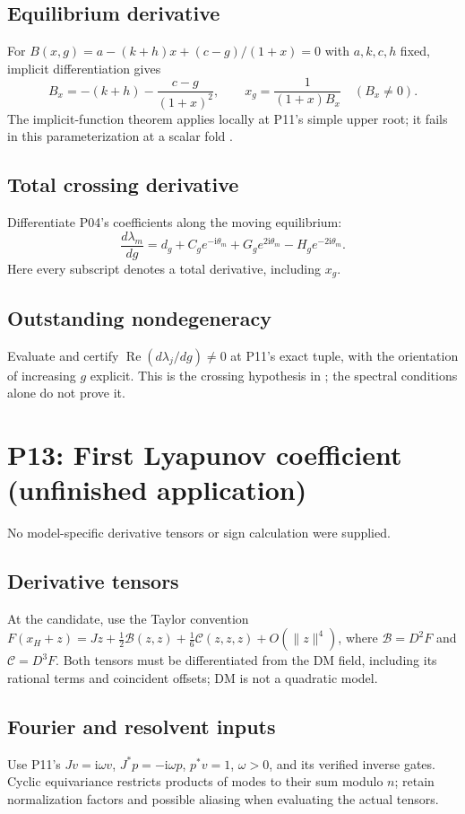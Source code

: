 \documentclass[11pt]{article}
\let\OriginalCite\cite
\renewcommand{\cite}[2][]{%
  \textcolor{CitationRed}{%
    \if\relax\detokenize{#1}\relax
      \OriginalCite{#2}%
    \else
      \OriginalCite[#1]{#2}%
    \fi}}
\newcommand{\ii}{\mathrm{i}}
\DeclareMathOperator{\Ree}{Re}
\theoremstyle{definition}
\theoremstyle{remark}
\begin{document}
\subsection{Equilibrium derivative}\label{slot:P12-1}
For $B(x,g)=a-(k+h)x+(c-g)/(1+x)=0$ with $a,k,c,h$ fixed,
implicit differentiation gives
\[
 B_x=-(k+h)-\frac{c-g}{(1+x)^2},\qquad
 x_g=\frac{1}{(1+x)B_x}\quad(B_x\ne0).
\]
The implicit-function theorem applies locally at P11's simple upper root;
it fails in this parameterization at a scalar fold
\cite[Ch.~1]{GuckenheimerHolmes1983}.
\subsection{Total crossing derivative}\label{slot:P12-2}
Differentiate P04's coefficients along the moving equilibrium:
\[
 \frac{d\lambda_m}{dg}
 =d_g+C_g e^{-\ii\theta_m}+G_g e^{2\ii\theta_m}-H_g e^{-2\ii\theta_m}.
\]
Here every subscript denotes a total derivative, including $x_g$.
\subsection{Outstanding nondegeneracy}\label{slot:P12-3}
Evaluate and certify $\Ree(d\lambda_j/dg)\ne0$ at P11's exact tuple,
with the orientation of increasing $g$ explicit. This is the crossing
hypothesis in \cite{KuznetsovHopf2006}; the spectral conditions alone
do not prove it.


\section{P13: First Lyapunov coefficient (unfinished application)}
\label{sec:P13}
No model-specific derivative tensors or sign calculation were supplied.
\subsection{Derivative tensors}\label{slot:P13-1}
At the candidate, use the Taylor convention
$F(x_H+z)=Jz+\frac12\mathcal B(z,z)+\frac16\mathcal C(z,z,z)+O(\|z\|^4)$,
where $\mathcal B=D^2F$ and $\mathcal C=D^3F$.
Both tensors must be differentiated from the DM field, including its
rational terms and coincident offsets; DM is not a quadratic model.
\subsection{Fourier and resolvent inputs}\label{slot:P13-2}
Use P11's $Jv=\ii\omega v$, $J^*p=-\ii\omega p$, $p^*v=1$,
$\omega>0$, and its verified inverse gates. Cyclic equivariance restricts
products of modes to their sum modulo $n$; retain normalization factors
and possible aliasing when evaluating the actual tensors.
\end{document}
